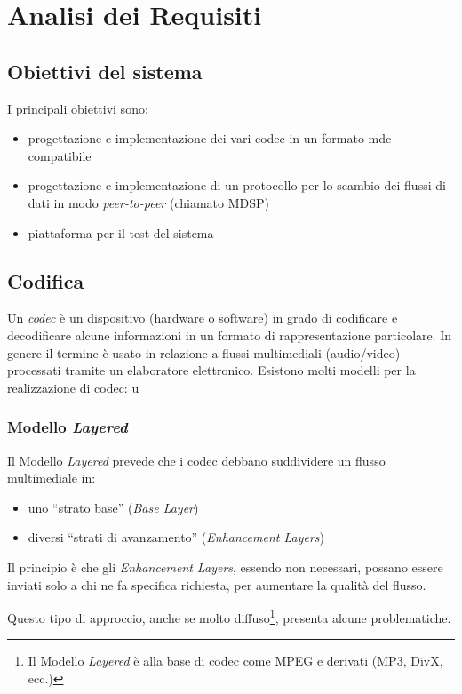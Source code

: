 \chapter{Analisi dei Requisiti}

\section{Obiettivi del sistema}

I principali obiettivi sono:

\begin{itemize}
\item progettazione e implementazione dei vari codec in un formato mdc-compatibile
\item progettazione e implementazione di un protocollo per lo scambio dei
flussi di dati in modo \emph{peer-to-peer} (chiamato MDSP)
\item piattaforma per il test del sistema
\end{itemize}



\section{Codifica}


Un \emph{codec} è un dispositivo (hardware o software) in grado di codificare e
decodificare alcune informazioni in un formato di rappresentazione particolare.
In genere il termine è usato in relazione a flussi multimediali (audio/video)
processati tramite un elaboratore elettronico.
Esistono molti modelli per la realizzazione di codec: u


\subsection{Modello \emph{Layered}}
Il Modello \emph{Layered} prevede che i codec debbano suddividere un flusso
multimediale in:
\begin{itemize}
  \item uno ``strato base'' (\emph{Base Layer})
  \item diversi ``strati di avanzamento'' (\emph{Enhancement Layers}) 
\end{itemize}

Il principio è che gli \emph{Enhancement Layers}, essendo non necessari, possano
essere inviati solo a chi ne fa specifica richiesta, per aumentare la
qualità del flusso.

Questo tipo di approccio, anche se molto diffuso\footnote{Il Modello
\emph{Layered} è alla base di codec come MPEG e derivati (MP3, DivX, ecc.)},
presenta alcune problematiche.

